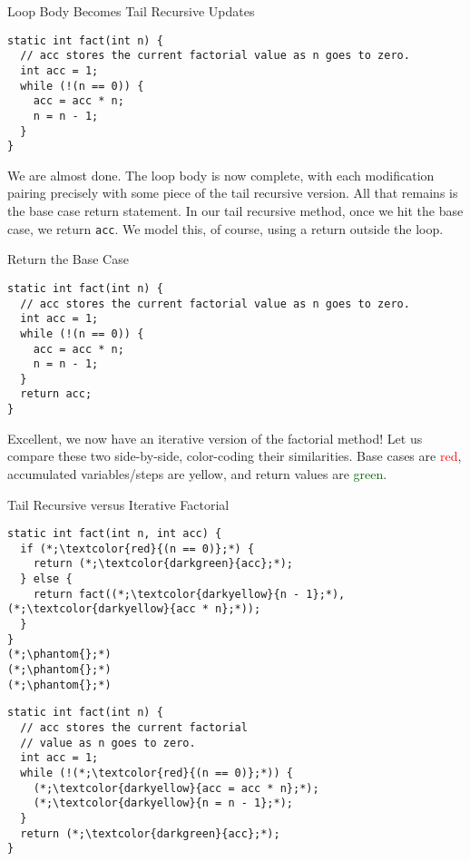 \begin{cl}[]{Loop Body Becomes Tail Recursive Updates}
\begin{lstlisting}[language=MyJava]
static int fact(int n) {
  // acc stores the current factorial value as n goes to zero.
  int acc = 1;
  while (!(n == 0)) {
    acc = acc * n;
    n = n - 1;
  }
}
\end{lstlisting}
\end{cl}

We are almost done. The loop body is now complete, with each modification pairing precisely with some piece of the tail recursive version. All that remains is the base case return statement. In our tail recursive method, once we hit the base case, we return \texttt{acc}. We model this, of course, using a return outside the loop.

\begin{cl}[]{Return the Base Case}
\begin{lstlisting}[language=MyJava]
static int fact(int n) {
  // acc stores the current factorial value as n goes to zero.
  int acc = 1;
  while (!(n == 0)) {
    acc = acc * n;
    n = n - 1;
  }
  return acc;
}
\end{lstlisting}
\end{cl}

Excellent, we now have an iterative version of the factorial method! Let us compare these two side-by-side, color-coding their similarities. Base cases are \textcolor{red}{red}, accumulated variables/steps are \textcolor{darkyellow}{yellow}, and return values are \textcolor{darkgreen}{green}. 

\begin{clrr}[]{Tail Recursive versus Iterative Factorial}
\begin{lstlisting}[language=MyJava]
static int fact(int n, int acc) {
  if (*;\textcolor{red}{(n == 0)};*) {
    return (*;\textcolor{darkgreen}{acc};*);
  } else {
    return fact((*;\textcolor{darkyellow}{n - 1};*), (*;\textcolor{darkyellow}{acc * n};*));
  }
}
(*;\phantom{};*)
(*;\phantom{};*)
(*;\phantom{};*)
\end{lstlisting}
\tcblower
\begin{lstlisting}[language=MyJavaNLN]
static int fact(int n) {
  // acc stores the current factorial
  // value as n goes to zero.
  int acc = 1;
  while (!(*;\textcolor{red}{(n == 0)};*)) {
    (*;\textcolor{darkyellow}{acc = acc * n};*);
    (*;\textcolor{darkyellow}{n = n - 1};*);
  }
  return (*;\textcolor{darkgreen}{acc};*);
}
\end{lstlisting}
\end{clrr}

